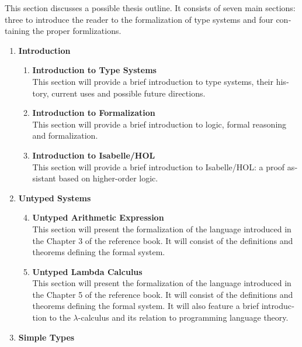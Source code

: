\documentclass[a4paper, oneside, 12pt, titlepage]{article}
\begin{document}
\begin{otherlanguage}{english}
  This section discusses a possible thesis outline. It consists of seven main sections: three to
  introduce the reader to the formalization of type systems and four containing the proper
  formlizations.

  \begin{enumerate}[label=\textbf{\Roman*}]
    \item \textbf{Introduction}
      \begin{enumerate}[label=\textbf{\arabic*}]
        \item \textbf{Introduction to Type Systems} ~ \\
          This section will provide a brief introduction to type systems, their history, current
          uses and possible future directions.
        \item \textbf{Introduction to Formalization} ~ \\
          This section will provide a brief introduction to logic, formal reasoning and
          formalization.
        \item \textbf{Introduction to Isabelle/HOL} ~ \\
          This section will provide a brief introduction to Isabelle/HOL: a proof assistant
          based on higher-order logic.
      \end{enumerate}
    \item \textbf{Untyped Systems}
      \begin{enumerate}[label=\textbf{\arabic*}]
        \setcounter{enumii}{3}
        \item \textbf{Untyped Arithmetic Expression} ~ \\
          This section will present the formalization of the language introduced in the Chapter 3 of
          the reference book. It will consist of the definitions and theorems defining the formal
          system.
        \item \textbf{Untyped Lambda Calculus} ~ \\
          This section will present the formalization of the language introduced in the Chapter 5 of
          the reference book. It will consist of the definitions and theorems defining the formal
          system. It will also feature a brief introduction to the $\lambda$-calculus and its
          relation to programming language theory.
      \end{enumerate}
    \item \textbf{Simple Types}
      \begin{enumerate}[label=\textbf{\arabic*}]

\end{enumerate}
\end{enumerate}
\end{otherlanguage}
\end{document}
